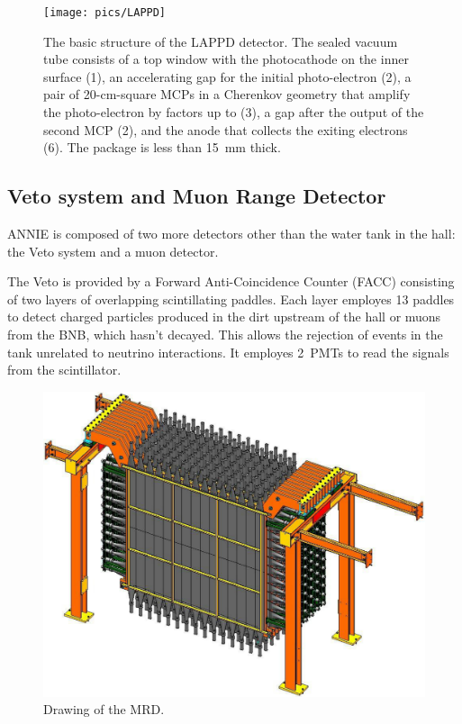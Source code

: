  \begin{figure}[]
   \centering
   \texttt{[image: pics/LAPPD]}
   \caption{The basic structure of the LAPPD detector. %
     The sealed vacuum tube consists of a top window with the photocathode on the inner surface (1), %
     an accelerating gap for the initial photo-electron (2), a pair of 20-cm-square MCPs in a Cherenkov geometry that %
     amplify the photo-electron by factors up to  (3), a gap after the output of the second MCP (2), %
     and the anode that collects the exiting electrons (6). The package is less than 15~mm thick.}
   \label{fig:LAPPD}
 \end{figure}


 \subsection[Veto and MRD]{Veto system and Muon Range Detector}
 \label{sec:mrd}
 \label{2.3}

 ANNIE is composed of two more detectors other than the water tank in the hall: the Veto system %
 and a muon detector.

 The Veto is provided by a Forward Anti-Coincidence Counter (FACC) consisting of two layers %
 of overlapping scintillating paddles.
 Each layer employes 13 paddles to detect charged particles produced in the dirt %
 upstream of the hall or muons from the BNB, which hasn't decayed.
 This allows the rejection of events in the tank unrelated to neutrino interactions.
 It employes 2\inch~PMTs to read the signals from the scintillator.

 \begin{figure}
   \centering
   \includegraphics[scale=.15]{pics/pag23Nakajimathesis}
   \caption{Drawing of the MRD.}
   \label{fig:mrd}
 \end{figure}
 
